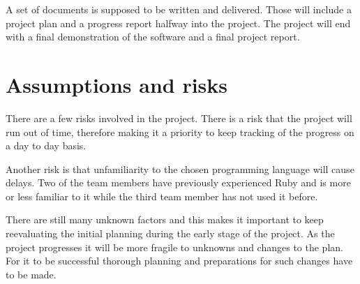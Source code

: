 \documentclass[10pt, titlepage, oneside, a4paper]{article}
\begin{document}
	A set of documents is supposed to be written and delivered. Those will include a project plan and a progress report halfway into the project. The project will end with a final demonstration of the software and a final project report.

	\section{Assumptions and risks}

	There are a few risks involved in the project. There is a risk that the project will run out of time, therefore making it a priority to keep tracking of the progress on a day to day basis.

	Another risk is that unfamiliarity to the chosen programming language will cause delays. Two of the team members have previously experienced Ruby and is more or less familiar to it while the third team member has not used it before.

	There are still many unknown factors and this makes it important to keep reevaluating the initial planning during the early stage of the project. As the project progresses it will be more fragile to unknowns and changes to the plan.  For it to be successful thorough planning and preparations for such changes have to be made.
\end{document}
